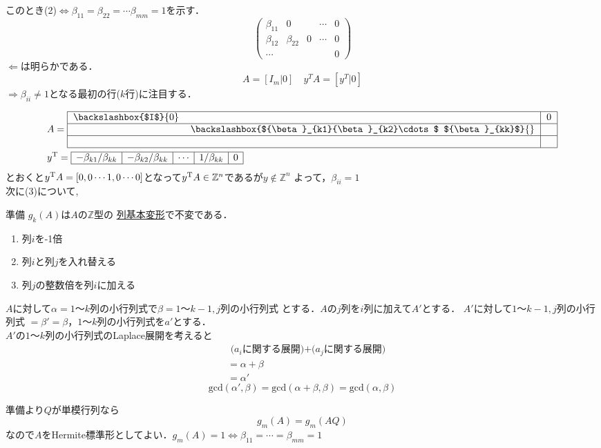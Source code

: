 このとき(2)$\Leftrightarrow{\beta}_{11}={\beta}_{22}=\cdots{\beta}_{mm}=1$を示す．
\begin{equation}
\begin{pmatrix}
    \beta_{11} &0&& \cdots& 0\\
    \beta_{12} &\beta_{22}& 0& \cdots& 0\\
    \cdots & && &0
    \end{pmatrix}
\end{equation}
$\Leftarrow$は明らかである．
\begin{equation}
    A = [I_m|0] \quad y^T A = [y^T | 0]
\end{equation}
$\Rightarrow{\beta}_{ii}\neq 1$となる最初の行($k$行)に注目する．

\begin{align*}
  &A=
  \begin{tabular}{|cc|c|}
    \hline
    \backslashbox{$I$}{0}&&0\\\hline
    &\backslashbox{${\beta}_{k1}{\beta}_{k2}\cdots$ ${\beta}_{kk}$}{}&\\\hline
    &&\\\hline
  \end{tabular}\\
  &\transpose{y}=
  \begin{array}{|c|c|c|c|c|}
    \hline
    -{\beta}_{k1}/{\beta}_{kk}&-{\beta}_{k2}/{\beta}_{kk}&\cdots&1/{\beta}_{kk}&0\\\hline
  \end{array}
\end{align*}
とおくと${y}^{\mathrm{T}}A=[0,0\cdots 1,0\cdots 0]$となって${y}^{\mathrm{T}}A\in{\mathbb{Z}}^n$であるが$y\notin{\mathbb{Z}}^n$
よって，$\beta_{ii} = 1$\\
次に(3)について,
\begin{itembox}[l]{準備}
$g_k (A)$は$A$の$\mathbb{Z}$型の
\hyperlink{basictrans}{列基本変形}で不変である．
\begin{enumerate}
    \item 列$i$を-1倍
    \item 列$i$と列$j$を入れ替える
    \item 列$j$の整数倍を列$i$に加える
\end{enumerate}
$A$に対して$\alpha=1～k$列の小行列式で$\beta=1～k-1,j$列の小行列式
とする．$A$の$j$列を$i$列に加えて$A'$とする．
$A'$に対して$1～k-1,j$列の小行列式 $=\beta' = \beta $，$1～k$列の小行列式を$a'$とする．\\
$A'$の$1～k$列の小行列式のLaplace展開を考えると
\begin{align}
   &\text{ ($a_i$に関する展開)+($a_j$に関する展開)}\\
   & = \alpha + \beta\\
   & = \alpha'
\end{align}
\begin{equation}
    \mathrm{gcd}(\alpha', \beta)
    = \mathrm{gcd} (\alpha + \beta, \beta)
    = \mathrm{gcd} (\alpha, \beta)
\end{equation}
\end{itembox}
準備より$Q$が単模行列なら
\begin{equation}
g_m (A)=g_m (AQ)
\end{equation}
なので$A$をHermite標準形としてよい．$g_m (A)=1\Leftrightarrow{\beta}_{11}=\cdots ={\beta}_{mm}=1$

